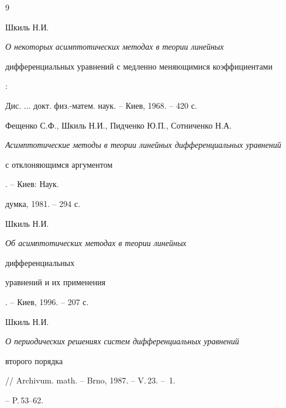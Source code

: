 \begin{thebibliography}{9} 


 




Шкиль Н.И. {\em О некоторых асимптотических методах в теории линейных 


дифференциальных уравнений с медленно меняющимися коэффициентами}: 


Дис. $\dotsc$ докт. физ.-матем. наук. -- Киев, 1968. -- 420 с. 




Фещенко С.Ф., Шкиль Н.И., Пидченко Ю.П., Сотниченко Н.А. 


{\em Асимптотические методы в теории линейных дифференциальных уравнений 


с отклоняющимся аргументом}. -- Киев: Наук. 


думка, 1981. -- 294 с. 




Шкиль Н.И. {\em Об асимптотических методах в теории линейных 


дифференциальных 


уравнений и их применения}. -- Киев, 1996. -- 207 с. 




Шкиль Н.И. {\em О периодических решениях систем дифференциальных уравнений 


второго порядка} // Archivum. math. -- Brno, 1987. -- V.\,23. -- \No\,1. 


-- P.\,53--62. 


 


\end{thebibliography} 


 


\vskip 2cm 


 








\label{end} 


 


